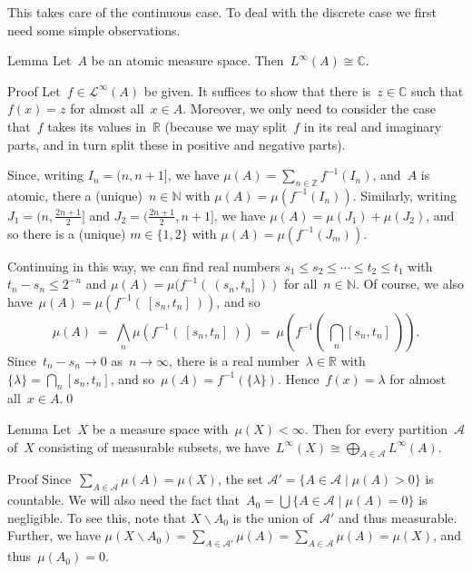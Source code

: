 \documentclass[a]{subfiles}
\begin{document}
\begin{parsec}%
\begin{point}%
This takes care of the continuous case.
To deal with the discrete case we first need some
simple observations.
\end{point}
\begin{point}{Lemma}%
Let~$A$ be an atomic measure space.
Then~$L^\infty(A)\cong \mathbb{C}$.
\begin{point}{Proof}
Let~$f\in \mathcal{L}^\infty(A)$ be given.
It suffices to show that
there is~$z\in \mathbb{C}$
such that
$f(x)=z$ for almost all~$x\in A$.
Moreover, we only need to consider the case
that~$f$ takes its values in~$\mathbb{R}$
(because we may split~$f$ in its real and imaginary parts,
and in turn split these in positive and negative parts).

Since,
writing  $I_n = (n,n+1]$,
we have $\mu(A) = \sum_{n\in\mathbb{Z}} f^{-1}(I_n)$,
and~$A$ is atomic,
there a (unique)~$n\in \mathbb{N}$
with  $\mu(A)=\mu(f^{-1}(I_n))$.
Similarly,
writing 
$J_{1} = (n,\frac{2n+1}{2}]$
and $J_{2}=(\frac{2n+1}{2},n+1]$,
we have
$\mu(A) = \mu(J_{1}) + \mu(J_{2})$,
and so there is a (unique)  $m\in \{1,2\}$
with $\mu(A)=\mu(f^{-1}(J_{m}))$.

Continuing in this way,
we can find real numbers $s_1 \leq s_2 \leq \dotsb \leq t_2 \leq t_1$
with $t_n-s_n \leq 2^{-n}$
and $\mu(A)=\mu( f^{-1}(\ (s_n,t_n]\ ))$
for all~$n\in \mathbb{N}$.
Of course,
we also have~$\mu(A)=\mu(f^{-1}(\ [s_n,t_n]\ ))$,
and so
\begin{equation*}
\textstyle
\mu(A) \ =\  \bigwedge_n \mu(f^{-1}(\ [s_n,t_n]\ ))
\ =\  \mu(f^{-1}(\ \bigcap_n [s_n,t_n]\ )).
\end{equation*}
Since~$t_n-s_n \to 0$ as~$n\to \infty$,
there is a real number~$\lambda\in \mathbb{R}$
with $\{\lambda \} = \bigcap_n[s_n,t_n]$,
and so~$\mu(A)=f^{-1}(\{\lambda\})$.
Hence~$f(x)=\lambda$ for almost all~$x\in A$.\qed
\end{point}
\end{point}
\begin{point}{Lemma}%
Let~$X$ be a measure space with~$\mu(X)<\infty$.
Then for every partition~$\mathcal{A}$
of~$X$
consisting of measurable subsets,
we have~$L^\infty(X)\cong \bigoplus_{A\in\mathcal{A}} L^\infty(A)$.
\begin{point}{Proof}%
Since~$\sum_{A\in\mathcal{A}} \mu(A)=\mu(X)$,
the set $\mathcal{A}' = \{A\in \mathcal{A}\mid \mu(A)>0\}$
is countable.
We will also
need the fact that~$A_0 = \bigcup\{ A\in\mathcal{A}\mid \mu(A)=0\}$
is negligible.
To see this,
note that
$X\backslash A_0$ is 
the union of~$\mathcal{A}'$
and thus measurable.
Further, we have $\mu(X\backslash A_0) = 
\sum_{A\in \mathcal{A}'} \mu(A)
= \sum_{A\in\mathcal{A}} \mu(A)=\mu(X)$,
and thus~$\mu(A_0)=0$.


\end{point}
\end{point}
\end{parsec}
\end{document}
